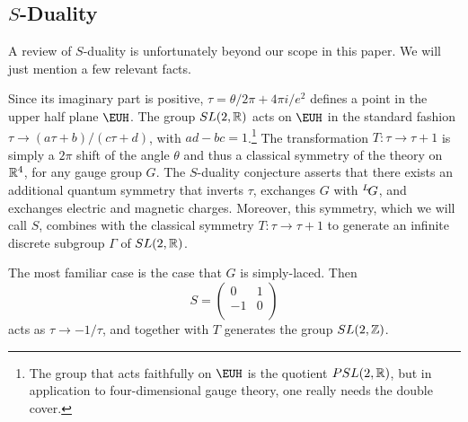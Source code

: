 
\subsection{$S$-Duality}

\label{sec:reviewsd}

A review of $S$-duality is unfortunately beyond our scope in this
paper.  We will just mention a few relevant facts.

Since its imaginary part is positive, $\tau=\theta/2\pi +4\pi
i/e^2$ defines a point in the upper half plane ${\EUH}$.  The
group $SL(2,\Bbb{R})$ acts on ${\EUH}$ in the standard fashion
$\tau\to (a\tau+b)/(c\tau+d)$, with $ad-bc=1$.\footnote{The group that
acts faithfully on ${\EUH}$ is the quotient $PSL(2,\Bbb{R})$, but
in application to four-dimensional gauge theory, one really needs
the double cover.} The transformation $T:\tau\to\tau+1$ is simply
a $2\pi$ shift of the angle $\theta$ and thus a classical symmetry
of the theory on $\Bbb{R}^4$, for any gauge group $G$. The
$S$-duality conjecture asserts that there exists an additional
quantum symmetry that inverts $\tau$, exchanges $G$ with
$^L\negthinspace G$, and exchanges electric and magnetic charges.
Moreover, this symmetry, which we will call $S$, combines with the
classical symmetry $T:\tau\to\tau+1$ to generate an infinite
discrete subgroup $\Gamma$ of $SL(2,\Bbb{R})$.

The most familiar case is the case that $G$ is simply-laced.  Then
\setcounter{equation}{15}
\begin{equation}\label{eq:bivolo}
S=\left(\begin{matrix} 0 & 1\\ -1 & 0\\\end{matrix}\right)
\end{equation}
 acts as
$\tau\to -1/\tau$, and together with $T$ generates the group
$SL(2,\Bbb{Z})$.

